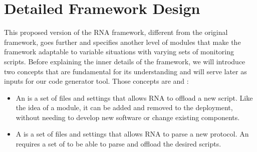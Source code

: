 \section{Detailed Framework Design}
\label{sec:detailed_design}

This proposed version of the RNA framework, different from the original framework, goes further and specifies another level of modules that make the framework adaptable to variable situations with varying sets of monitoring scripts. Before explaining the inner details of the framework, we will introduce two concepts that are fundamental for its understanding and will serve later as inputs for our code generator tool. Those concepts are \ProtocolTemplate{} and \Offloader{}:

\begin{itemize}
    \item An \textit{\Offloader{}} is a set of files and settings that allows RNA to offload a new script. Like the idea of a module, it can be added and removed to the deployment, without needing to develop new software or change existing components.

    \item A \textit{\ProtocolTemplate{}} is a set of files and settings that allows RNA to parse a new protocol. An \Offloader{} requires a set of \ProtocolTemplates{} to be able to parse and offload the desired scripts.
\end{itemize}

